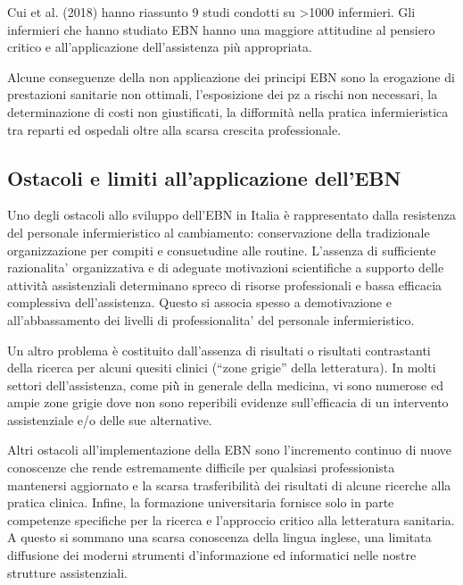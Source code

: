 \documentclass[]{book}
\begin{document}
Cui et al. (2018) hanno riassunto 9 studi condotti su \textgreater{}1000 infermieri. Gli infermieri che hanno studiato EBN hanno una maggiore attitudine al pensiero critico e all'applicazione dell'assistenza più appropriata.

Alcune conseguenze della non applicazione dei principi EBN sono la erogazione di prestazioni sanitarie non ottimali, l'esposizione dei pz a rischi non necessari, la determinazione di costi non giustificati, la difformità nella pratica infermieristica tra reparti ed ospedali oltre alla scarsa crescita professionale.

\hypertarget{ostacoli-e-limiti-allapplicazione-dellebn}{%
\subsection{Ostacoli e limiti all'applicazione dell'EBN}\label{ostacoli-e-limiti-allapplicazione-dellebn}}

Uno degli ostacoli allo sviluppo dell'EBN in Italia è rappresentato dalla resistenza del personale infermieristico al cambiamento: conservazione della tradizionale organizzazione per compiti e consuetudine alle routine. L'assenza di sufficiente razionalita' organizzativa e di adeguate motivazioni scientifiche a supporto delle attività̀ assistenziali determinano spreco di risorse professionali e bassa efficacia complessiva dell'assistenza. Questo si associa spesso a demotivazione e all'abbassamento dei livelli di professionalita' del personale infermieristico.

Un altro problema è costituito dall'assenza di risultati o risultati contrastanti della ricerca per alcuni quesiti clinici (``zone grigie'' della letteratura). In molti settori dell'assistenza, come più̀ in generale della medicina, vi sono numerose ed ampie zone grigie dove non sono reperibili evidenze sull'efficacia di un intervento assistenziale e/o delle sue alternative.

Altri ostacoli all'implementazione della EBN sono l'incremento continuo di nuove conoscenze che rende estremamente difficile per qualsiasi professionista mantenersi aggiornato e la scarsa trasferibilità dei risultati di alcune ricerche alla pratica clinica. Infine, la formazione universitaria fornisce solo in parte competenze specifiche per la ricerca e l'approccio critico alla letteratura sanitaria. A questo si sommano una scarsa conoscenza della lingua inglese, una limitata diffusione dei moderni strumenti d'informazione ed informatici nelle nostre strutture assistenziali.
\end{document}
